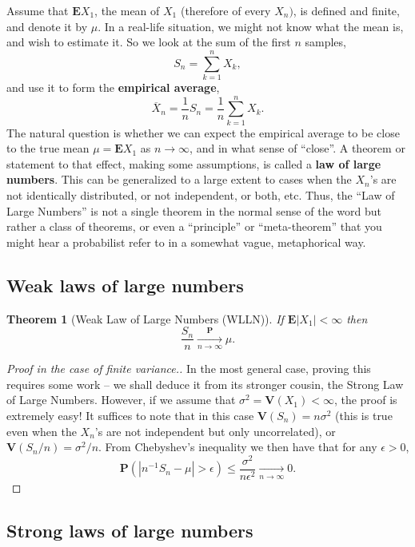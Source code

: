 \documentclass[12pt]{article}
\newtheorem{thm}{Theorem}[section]
\newcommand{\prob}{\mathbf{P}}
\newcommand{\expec}{\mathbf{E}}
\newcommand{\var}{\mathbf{V}}
\theoremstyle{example}
\begin{document}
Assume that $\expec X_1$, the mean of $X_1$ (therefore of every $X_n)$, is defined and finite, and denote it by $\mu$. In a real-life situation, we might not know what the mean is, and wish to estimate it. So we look at the sum of the first $n$ samples,
$$ S_n = \sum_{k=1}^n X_k, $$
and use it to form the \textbf{empirical average},
$$ \overline{X}_n = \frac1n S_n = \frac{1}{n} \sum_{k=1}^n X_k. $$
The natural question is whether we can expect the empirical average to be close to the true mean $\mu=\expec X_1$ as $n\to\infty$, and in what sense of ``close''. A theorem or statement to that effect, making some assumptions, is called a \textbf{law of large numbers}. This can be generalized to a large extent to cases when the $X_n$'s are not identically distributed, or not independent, or both, etc. Thus, the ``Law of Large Numbers'' is not a single theorem in the normal sense of the word but rather a class of theorems, or even a ``principle'' or ``meta-theorem'' that you might hear a probabilist refer to in a somewhat vague, metaphorical way.

\subsection{Weak laws of large numbers}

\begin{thm}[Weak Law of Large Numbers (WLLN)] If $\expec|X_1|<\infty$ then
$$ \frac{S_n}{n} \xrightarrow[n\to\infty]{\prob} \mu. $$
\label{thm-wlln}
\end{thm}

\begin{proof}[Proof in the case of finite variance.] In the most general case, proving this requires some work -- we shall deduce it from its stronger cousin, the Strong Law of Large Numbers. However, if we assume that $\sigma^2 = \var(X_1)<\infty$, the proof is extremely easy! It suffices to note that in this case $\var(S_n) = n \sigma^2$ (this is true even when the $X_n$'s are not independent but only uncorrelated), or $\var(S_n/n) = \sigma^2/n$.
From Chebyshev's inequality we then have that for any $\epsilon>0$,
\begin{equation} \label{eq:variancebound}
 \prob(|n^{-1} S_n - \mu|>\epsilon) \le \frac{\sigma^2}{n \epsilon^2} \xrightarrow[n\to\infty]{} 0.
\end{equation}
\end{proof}


\subsection{Strong laws of large numbers}
\end{document}
